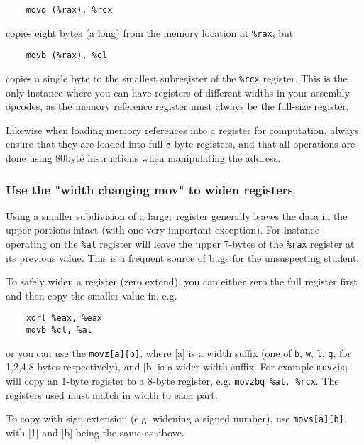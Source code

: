 \documentclass[11pt]{article}
\begin{document}
\begin{lstlisting}
    movq (%rax), %rcx
\end{lstlisting}

copies eight bytes (a  long) from the memory location at \texttt{\%rax}, but

\begin{lstlisting}
    movb (%rax), %cl
\end{lstlisting}

copies a single byte to the smallest subregister of the \texttt{\%rcx} register. This is
the only instance where you can have registers of different widths in your assembly
opcodes, as the memory reference register must always be the full-size register.

Likewise when loading memory references into a register for computation, always ensure that
they are loaded into full 8-byte registers, and that all operations are done using 80byte
instructions when manipulating the address.

\subsubsection{Use the "width changing mov" to widen registers}

Using a smaller subdivision of a larger register generally leaves the data in the upper
portions intact (with one very important exception). For instance operating on the
\texttt{\%al} register will leave the upper 7-bytes of the \texttt{\%rax} register at its
previous value. This is a frequent source of bugs for the unsuspecting student.

To safely widen a register (zero extend), you can either zero the full register first and
then copy the smaller value in, e.g.

\begin{lstlisting}
    xorl %eax, %eax
    movb %cl, %al
\end{lstlisting}

or you can use the \texttt{movz[a][b]}, where [a] is a width suffix (one of \texttt{b},
\texttt{w}, \texttt{l}, \texttt{q}, for 1,2,4,8 bytes respectively), and [b] is a wider
width suffix. For example \texttt{movzbq} will copy an 1-byte register to a 8-byte
register, e.g. \texttt{movzbq \%al, \%rcx}. The registers used must match in width to each
part.

To copy with sign extension (e.g. widening a signed number), use \texttt{movs[a][b]}, with
[1] and [b] being the same as above.
\end{document}
